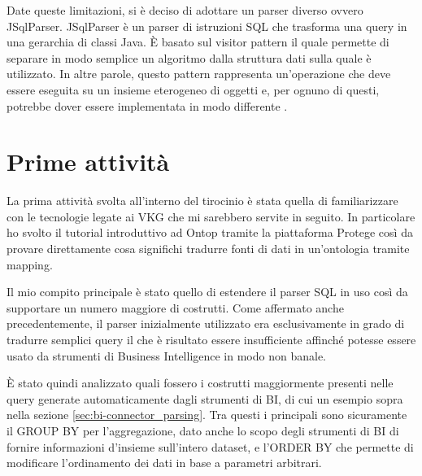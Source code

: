 Date queste limitazioni, si è deciso di adottare un parser diverso ovvero JSqlParser. JSqlParser è un parser di istruzioni SQL
che trasforma una query in una gerarchia di classi Java. \`E basato sul visitor pattern il quale permette di separare in modo semplice un algoritmo dalla struttura dati sulla quale è utilizzato.
In altre parole, questo pattern rappresenta un'operazione che deve essere eseguita su un insieme eterogeneo di oggetti e, per ognuno di questi, potrebbe dover essere implementata in modo differente \cite{JSqlParser}.

\section{Prime attività}
\label{sec:prerequisits}
La prima attività svolta all'interno del tirocinio è stata quella di familiarizzare con le tecnologie legate ai VKG che mi sarebbero servite in seguito. In particolare ho svolto
il tutorial introduttivo ad Ontop tramite la piattaforma Protege così da provare direttamente cosa significhi tradurre fonti di dati in un'ontologia tramite mapping.

Il mio compito principale è stato quello di estendere il parser SQL in uso così da supportare un numero maggiore di costrutti. Come affermato anche precedentemente, il parser inizialmente utilizzato era
esclusivamente in grado di tradurre semplici query il che è risultato essere insufficiente affinché potesse essere usato da strumenti di Business Intelligence in modo non banale.

\`E stato quindi analizzato quali fossero i costrutti maggiormente presenti nelle query generate automaticamente dagli strumenti di BI, di cui un esempio sopra nella sezione \ref{sec:bi-connector_parsing}. Tra questi
i principali sono sicuramente il GROUP BY per l'aggregazione, dato anche lo scopo degli strumenti di BI di fornire informazioni d'insieme sull'intero dataset, e l'ORDER BY che
permette di modificare l'ordinamento dei dati in base a parametri arbitrari.

